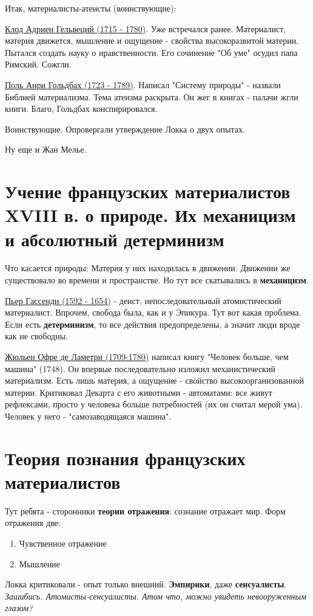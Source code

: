 Итак, материалисты-атеисты (воинствующие):

\underline{Клод Адриен Гельвеций (1715 - 1780)}. Уже встречался ранее. Материалист, материя движется, мышление и ощущение - свойства высокоразвитой материи. Пытался создать науку о нравственности. Его сочинение "Об уме" осудил папа Римский. Сожгли.

\underline{Поль Анри Гольдбах (1723 - 1789)}. Написал "Систему природы" - назвали Библией материализма. Тема атеизма раскрыта. Он жег в книгах - палачи жгли книги. Благо, Гольдбах конспирировался.

Воинствующие. Опровергали утверждение Локка о двух опытах. 

Ну еще и Жан Мелье.

\section{Учение французских материалистов XVIII в. о природе. Их механицизм и абсолютный детерминизм}
Что касается природы: Материя у них находилась в движении. Движении же существовало во времени и пространстве. Но тут все скатывались в \textbf{механицизм}.

\underline{Пьер Гассенди (1592 - 1654)} - деист, непоследовательный атомистический материалист. Впрочем, свобода была, как и у Эпикура. Тут вот какая проблема. Если есть \textbf{детерминизм}, то все действия предопределены, а значит люди вроде как не свободны. 

\underline{Жюльен Офре де Ламетри (1709-1780)} написал книгу "Человек больше, чем машина" (1748). Он впервые последовательно изложил механистический материализм. Есть лишь материя, а ощущение - свойство высокоорганизованной материи. Критиковал Декарта с его животными - автоматами: все живут рефлексами, просто у человека больше потребностей (их он считал мерой ума). Человек у него - "самозаводящаяся машина".


\section{Теория познания французских материалистов}
Тут ребята - сторонники \textbf{теории отражения}: сознание отражает мир. Форм отражения две:
\begin{enumerate}
\item Чувственное отражение
\item Мышление
\end{enumerate}
Локка критиковали - опыт только внешний. \textbf{Эмпирики}, даже \textbf{сенсуалисты}. \textit{Зашибись. Атомисты-сенсуалисты. Атом что, можно увидеть невооруженным глазом?}

